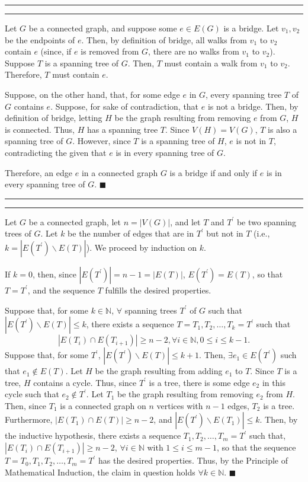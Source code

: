 \documentclass[11pt]{article}
\newcounter{questionCounter}
\newcounter{partCounter}[questionCounter]
\newenvironment{question}[2][\arabic{questionCounter}]{%
    \setcounter{partCounter}{0}%
    \vspace{.25in} \hrule \vspace{0.5em}%
        \noindent{\bf #2}%
    \vspace{0.8em} \hrule \vspace{.10in}%
    \addtocounter{questionCounter}{1}%
}{}
\begin{document}
\begin{question}{Problem 3}
Let $G$ be a connected graph, and suppose some $e \in E(G)$ is a bridge. Let
$v_1,v_2$ be the endpoints of $e$. Then, by definition of bridge, all walks
from $v_1$ to $v_2$ contain $e$ (since, if $e$ is removed from $G$, there are
no walks from $v_1$ to $v_2$). Suppose $T$ is a spanning tree of $G$. Then,
$T$ must contain a walk from $v_1$ to $v_2$. Therefore, $T$ must contain $e$.

Suppose, on the other hand, that, for some edge $e$ in $G$, every spanning
tree $T$ of $G$ contains $e$. Suppose, for sake of contradiction, that $e$ is
not a bridge. Then, by definition of bridge, letting $H$ be the graph
resulting from removing $e$ from $G$, $H$ is connected. Thus, $H$ has a
spanning tree $T$. Since $V(H) = V(G)$, $T$ is also a spanning tree of $G$.
However, since $T$ is a spanning tree of $H$, $e$ is not in $T$, contradicting
the given that $e$ is in every spanning tree of $G$.

Therefore, an edge $e$ in a connected graph $G$ is a bridge if and only if $e$
is in every spanning tree of $G$. \qquad $\blacksquare$
\end{question}

\begin{question}{Problem 4}
Let $G$ be a connected graph, let $n = |V(G)|$, and let $T$ and $T^{\prime}$
be two spanning trees of $G$. Let $k$ be the number of edges that are in
$T^{\prime}$ but not in $T$ (i.e., $k = |E(T^{\prime}) \backslash E(T)|$).
We proceed by induction on $k$.

If $k = 0$, then, since $|E(T^{\prime})| = n - 1 = |E(T)|$,
$E(T^{\prime}) = E(T)$, so that $T = T^{\prime}$, and the sequence $T$
fulfills the desired properties.

Suppose that, for some $k \in \mathbb{N}$, $\forall$ spanning trees $T^{\prime}$ of
$G$ such that $|E(T^{\prime}) \backslash E(T)| \leq k$, there exists a
sequence $T = T_1,T_2,\ldots,T_k = T^{\prime}$ such that
\[|E(T_i) \cap E(T_{i + 1})| \geq n - 2,
                              \forall i \in \mathbb{N}, 0 \leq i \leq k - 1.\]
Suppose that, for some $T^{\prime}$,
$|E(T^{\prime}) \backslash E(T)| \leq k + 1$.
Then, $\exists e_1 \in E(T^{\prime})$ such that $e_1 \not \in E(T)$. Let $H$
be the graph resulting from adding $e_1$ to $T$. Since $T$ is a tree, $H$
contains a cycle. Thus, since $T^{\prime}$ is a tree, there is some edge $e_2$
in this cycle such that $e_2 \not \in T^{\prime}$. Let $T_1$ be the graph
resulting from removing $e_2$ from $H$. Then, since $T_1$ is a connected graph
on $n$ vertices with $n - 1$ edges, $T_2$ is a tree. Furthermore,
$|E(T_1)\cap E(T)|\geq n - 2$, and $|E(T^{\prime})\backslash E(T_1)|\leq k$.
Then, by the inductive hypothesis, there exists a sequence
$T_1, T_2, \ldots, T_m = T^{\prime}$ such that,
$|E(T_i) \cap E(T_{i + 1})| \geq n - 2$, $\forall i \in \mathbb{N}$ with
$1 \leq i \leq m - 1$, so that the sequence
$T = T_0,T_1,T_2,\ldots,T_m = T^{\prime}$ has the desired properties.
Thus, by the Principle of Mathematical Induction, the claim in question holds
$\forall k \in \mathbb{N}$. \qquad $\blacksquare$
\end{question}
\end{document}
